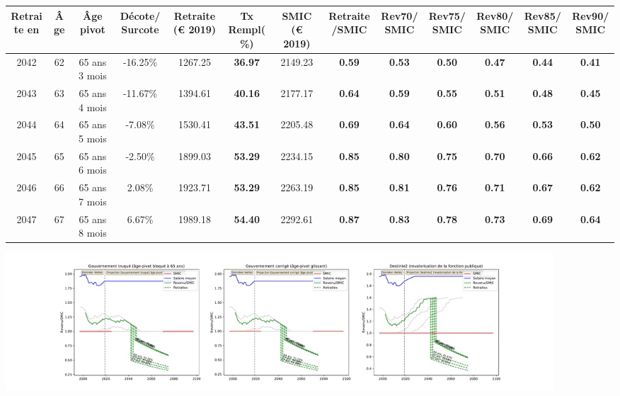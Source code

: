 { \scriptsize \begin{center} 
\begin{tabular}[htb]{|c|c||c|c||c|c||c||c|c|c|c|c|c|} 
\hline 
 Retraite en &  Âge &  Âge pivot &  Décote/Surcote &  Retraite (\euro{} 2019) &  Tx Rempl(\%) &  SMIC (\euro{} 2019) &  Retraite/SMIC &  Rev70/SMIC &  Rev75/SMIC &  Rev80/SMIC &  Rev85/SMIC &  Rev90/SMIC \\ 
\hline \hline 
 2042 &  62 &  65 ans 3 mois &  -16.25\% &  1267.25 &  {\bf 36.97} &  2149.23 &  {\bf {\color{red} 0.59}} &  {\bf {\color{red} 0.53}} &  {\bf {\color{red} 0.50}} &  {\bf {\color{red} 0.47}} &  {\bf {\color{red} 0.44}} &  {\bf {\color{red} 0.41}} \\ 
\hline 
 2043 &  63 &  65 ans 4 mois &  -11.67\% &  1394.61 &  {\bf 40.16} &  2177.17 &  {\bf {\color{red} 0.64}} &  {\bf {\color{red} 0.59}} &  {\bf {\color{red} 0.55}} &  {\bf {\color{red} 0.51}} &  {\bf {\color{red} 0.48}} &  {\bf {\color{red} 0.45}} \\ 
\hline 
 2044 &  64 &  65 ans 5 mois &  -7.08\% &  1530.41 &  {\bf 43.51} &  2205.48 &  {\bf {\color{red} 0.69}} &  {\bf {\color{red} 0.64}} &  {\bf {\color{red} 0.60}} &  {\bf {\color{red} 0.56}} &  {\bf {\color{red} 0.53}} &  {\bf {\color{red} 0.50}} \\ 
\hline 
 2045 &  65 &  65 ans 6 mois &  -2.50\% &  1899.03 &  {\bf 53.29} &  2234.15 &  {\bf {\color{red} 0.85}} &  {\bf {\color{red} 0.80}} &  {\bf {\color{red} 0.75}} &  {\bf {\color{red} 0.70}} &  {\bf {\color{red} 0.66}} &  {\bf {\color{red} 0.62}} \\ 
\hline 
 2046 &  66 &  65 ans 7 mois &  2.08\% &  1923.71 &  {\bf 53.29} &  2263.19 &  {\bf {\color{red} 0.85}} &  {\bf {\color{red} 0.81}} &  {\bf {\color{red} 0.76}} &  {\bf {\color{red} 0.71}} &  {\bf {\color{red} 0.67}} &  {\bf {\color{red} 0.62}} \\ 
\hline 
 2047 &  67 &  65 ans 8 mois &  6.67\% &  1989.18 &  {\bf 54.40} &  2292.61 &  {\bf {\color{red} 0.87}} &  {\bf {\color{red} 0.83}} &  {\bf {\color{red} 0.78}} &  {\bf {\color{red} 0.73}} &  {\bf {\color{red} 0.69}} &  {\bf {\color{red} 0.64}} \\ 
\hline 
\hline 
\end{tabular} 
\end{center} } 

 \begin{center}\includegraphics[width=0.9\textwidth]{fig/ATSEM_1980_22_dest_retraite.pdf}\end{center} \label{fig/ATSEM_1980_22_dest_retraite.pdf} 

